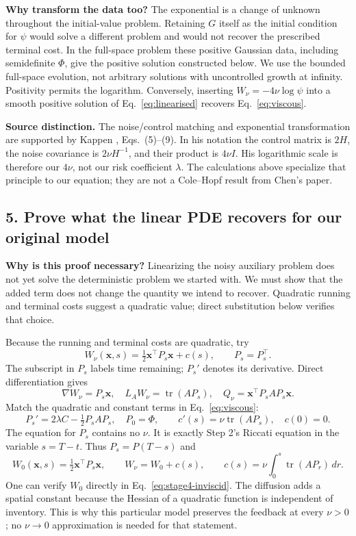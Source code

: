 \documentclass[11pt,a4paper]{article}
\begin{document}
\textbf{Why transform the data too?} The exponential is a change of
unknown throughout the initial-value problem. Retaining $G$ itself as
the initial condition for $\psi$ would solve a different problem and
would not recover the prescribed terminal cost.
In the full-space problem these positive Gaussian data, including
semidefinite $\Phi$, give the positive solution constructed below. We use
the bounded full-space evolution, not arbitrary solutions with uncontrolled
growth at infinity. Positivity permits the logarithm. Conversely, inserting
$W_\nu=-4\nu\log\psi$ into a smooth positive solution of
Eq.~\eqref{eq:linearised} recovers Eq.~\eqref{eq:viscous}.

\textbf{Source distinction.} The noise/control matching and exponential
transformation are supported by Kappen \cite{kappen2005}, Eqs.~(5)--(9).
In his notation the control matrix is $2H$, the noise covariance is
$2\nu H^{-1}$, and their product is $4\nu I$. His logarithmic scale is
therefore our $4\nu$, not our risk coefficient $\lambda$.
The calculations above specialize that principle to our equation;
they are not a Cole--Hopf result from Chen's paper.

\subsection*{5. Prove what the linear PDE recovers for our original model}

\textbf{Why is this proof necessary?} Linearizing the noisy auxiliary
problem does not yet solve the deterministic problem we started with.
We must show that the added term does not change the quantity we intend
to recover. Quadratic running and terminal costs suggest a quadratic
value; direct substitution below verifies that choice.

Because the running and terminal costs are quadratic, try
\[
 W_\nu(\mathbf x,s)=\tfrac12\mathbf x^\top P_s\mathbf x+c(s),
 \qquad P_s=P_s^\top.
\]
The subscript in $P_s$ labels time remaining; $P_s'$ denotes its
derivative. Direct differentiation gives
\[
 \nabla W_\nu=P_s\mathbf x,\quad
 L_AW_\nu=\operatorname{tr}(AP_s),\quad
 Q_\nu=\mathbf x^\top P_sAP_s\mathbf x.
\]
Match the quadratic and constant terms in Eq.~\eqref{eq:viscous}:
\begin{equation}
 P_s'=2\lambda C-\tfrac12P_sAP_s,\quad P_0=\Phi,
 \qquad c'(s)=\nu\operatorname{tr}(AP_s),\quad c(0)=0.
 \label{eq:stage4-quadratic}
\end{equation}
The equation for $P_s$ contains no $\nu$. It is exactly Step 2's Riccati
equation in the variable $s=T-t$. Thus $P_s=P(T-s)$ and
\begin{equation}
 W_0(\mathbf x,s)=\tfrac12\mathbf x^\top P_s\mathbf x,\qquad
 W_\nu=W_0+c(s),\qquad
 c(s)=\nu\int_0^s\operatorname{tr}(AP_r)\,dr.
 \label{eq:stage4-correction}
\end{equation}
One can verify $W_0$ directly in Eq.~\eqref{eq:stage4-inviscid}.
The diffusion adds a spatial constant because the Hessian of a quadratic
function is independent of inventory. This is why this particular model
preserves the feedback at every $\nu>0$; no $\nu\to0$ approximation is
needed for that statement.
\end{document}
